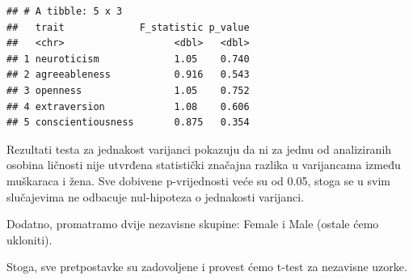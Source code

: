 \documentclass[
]{article}
\newenvironment{Shaded}{\begin{snugshade}}{\end{snugshade}}
\newcommand{\AttributeTok}[1]{\textcolor[rgb]{0.13,0.29,0.53}{#1}}
\newcommand{\CommentTok}[1]{\textcolor[rgb]{0.56,0.35,0.01}{\textit{#1}}}
\newcommand{\ControlFlowTok}[1]{\textcolor[rgb]{0.13,0.29,0.53}{\textbf{#1}}}
\newcommand{\DecValTok}[1]{\textcolor[rgb]{0.00,0.00,0.81}{#1}}
\newcommand{\FunctionTok}[1]{\textcolor[rgb]{0.13,0.29,0.53}{\textbf{#1}}}
\newcommand{\NormalTok}[1]{#1}
\newcommand{\OtherTok}[1]{\textcolor[rgb]{0.56,0.35,0.01}{#1}}
\newcommand{\SpecialCharTok}[1]{\textcolor[rgb]{0.81,0.36,0.00}{\textbf{#1}}}
\newcommand{\StringTok}[1]{\textcolor[rgb]{0.31,0.60,0.02}{#1}}
\begin{document}
\begin{verbatim}
## # A tibble: 5 x 3
##   trait             F_statistic p_value
##   <chr>                   <dbl>   <dbl>
## 1 neuroticism             1.05    0.740
## 2 agreeableness           0.916   0.543
## 3 openness                1.05    0.752
## 4 extraversion            1.08    0.606
## 5 conscientiousness       0.875   0.354
\end{verbatim}

Rezultati testa za jednakost varijanci pokazuju da ni za jednu od
analiziranih osobina ličnosti nije utvrđena statistički značajna razlika
u varijancama između muškaraca i žena. Sve dobivene p-vrijednosti veće
su od 0.05, stoga se u svim slučajevima ne odbacuje nul-hipoteza o
jednakosti varijanci.

Dodatno, promatramo dvije nezavisne skupine: Female i Male (ostale ćemo
ukloniti).

Stoga, sve pretpostavke su zadovoljene i provest ćemo t-test za
nezavisne uzorke.

\begin{Shaded}
\end{Shaded}
\end{document}
